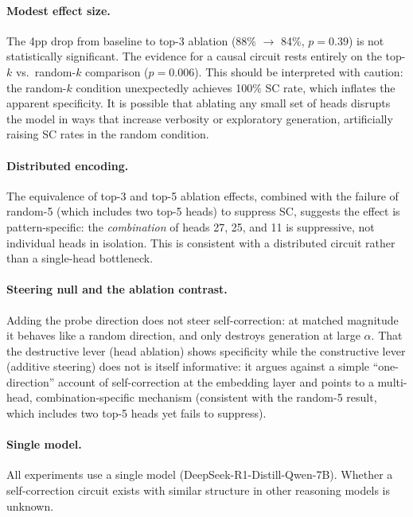 \documentclass{article}
\begin{document}
\paragraph{Modest effect size.}
The 4pp drop from baseline to top-3 ablation (88\% $\to$ 84\%, $p = 0.39$) is not statistically significant.
The evidence for a causal circuit rests entirely on the top-$k$ vs.\ random-$k$ comparison ($p = 0.006$).
This should be interpreted with caution: the random-$k$ condition unexpectedly achieves 100\% SC rate, which inflates the apparent specificity.
It is possible that ablating any small set of heads disrupts the model in ways that increase verbosity or exploratory generation, artificially raising SC rates in the random condition.

\paragraph{Distributed encoding.}
The equivalence of top-3 and top-5 ablation effects, combined with the failure of random-5 (which includes two top-5 heads) to suppress SC, suggests the effect is pattern-specific: the \emph{combination} of heads 27, 25, and 11 is suppressive, not individual heads in isolation.
This is consistent with a distributed circuit rather than a single-head bottleneck.

\paragraph{Steering null and the ablation contrast.}
Adding the probe direction does not steer self-correction: at matched magnitude it behaves like a random direction, and only destroys generation at large $\alpha$.
That the destructive lever (head ablation) shows specificity while the constructive lever (additive steering) does not is itself informative: it argues against a simple ``one-direction'' account of self-correction at the embedding layer and points to a multi-head, combination-specific mechanism (consistent with the random-5 result, which includes two top-5 heads yet fails to suppress).

\paragraph{Single model.}
All experiments use a single model (DeepSeek-R1-Distill-Qwen-7B).
Whether a self-correction circuit exists with similar structure in other reasoning models is unknown.

\end{document}
